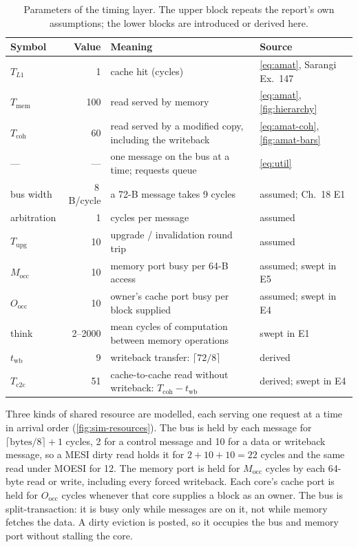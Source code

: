 \begin{table}[htbp]
\centering
\caption{Parameters of the timing layer. The upper block repeats the report's own
assumptions; the lower blocks are introduced or derived here.}
\label{tab:sim-latency}
\small
\begin{tabular}{@{}L{1.9cm} r L{5.6cm} L{3.4cm}@{}}
\toprule
Symbol & Value & Meaning & Source \\
\midrule
$T_{L1}$ & 1 & cache hit (cycles) & \cref{eq:amat}, Sarangi Ex.~147 \\
$T_{\mathrm{mem}}$ & 100 & read served by memory & \cref{eq:amat}, \cref{fig:hierarchy} \\
$T_{\mathrm{coh}}$ & 60 & read served by a modified copy, including the writeback & \cref{eq:amat-coh}, \cref{fig:amat-bars} \\
--- & --- & one message on the bus at a time; requests queue & \cref{eq:util} \\
\midrule
bus width & 8\,B/cycle & a 72-B message takes 9 cycles & assumed; Ch.~18 E1 \\
arbitration & 1 & cycles per message & assumed \\
$T_{\mathrm{upg}}$ & 10 & upgrade / invalidation round trip & assumed \\
$M_{\mathrm{occ}}$ & 10 & memory port busy per 64-B access & assumed; swept in E5 \\
$O_{\mathrm{occ}}$ & 10 & owner's cache port busy per block supplied & assumed; swept in E4 \\
think & 2--2000 & mean cycles of computation between memory operations & swept in E1 \\
\midrule
$t_{\mathrm{wb}}$ & 9 & writeback transfer: $\lceil 72/8 \rceil$ & derived \\
$T_{\mathrm{c2c}}$ & 51 & cache-to-cache read without writeback: $T_{\mathrm{coh}} - t_{\mathrm{wb}}$ & derived; swept in E4 \\
\bottomrule
\end{tabular}
\end{table}

Three kinds of shared resource are modelled, each serving one request at a time in
arrival order (\cref{fig:sim-resources}). The bus is held by each message for
$\lceil\text{bytes}/8\rceil + 1$ cycles, 2 for a control message and 10 for a data
or writeback message, so a MESI dirty read holds it for $2+10+10=22$ cycles and the
same read under MOESI for 12. The memory port is held for $M_{\mathrm{occ}}$ cycles
by each 64-byte read or write, including every forced writeback. Each core's cache
port is held for $O_{\mathrm{occ}}$ cycles whenever that core supplies a block as an
owner. The bus is split-transaction: it is busy only while messages are on it, not
while memory fetches the data. A dirty eviction is posted, so it occupies the bus
and memory port without stalling the core.

